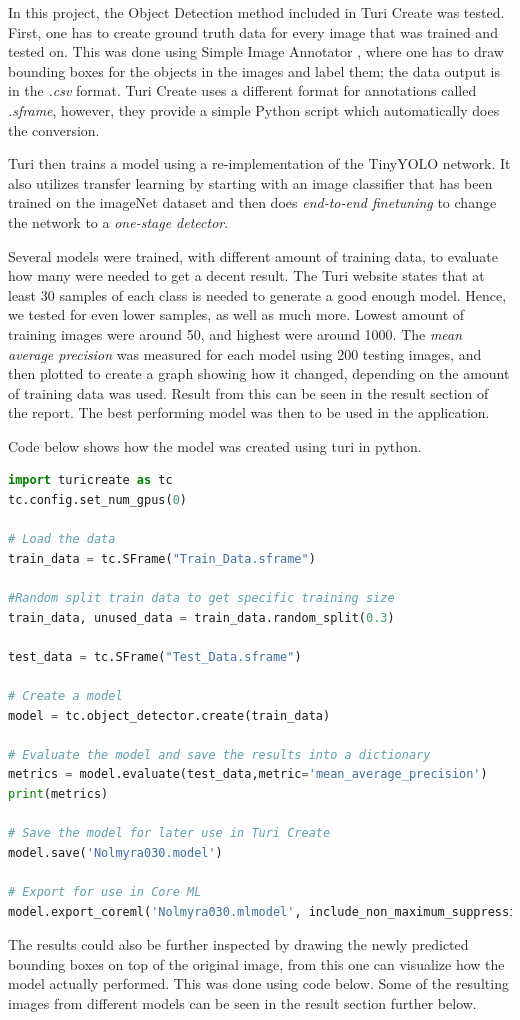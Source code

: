 In this project, the Object Detection method included in Turi Create was tested. First, one
 has to create ground truth data for every image that was trained and tested on. This was
 done using Simple Image Annotator \cite{simpleImage}, where one has to draw bounding
  boxes for the objects in the images and label them; the data output is in the \textit{.csv} format.  Turi Create uses a different format for annotations called \textit{.sframe},
  however, they provide a simple Python script which automatically does the conversion. 

Turi then trains a model using a re-implementation of the TinyYOLO network. It also utilizes transfer learning by starting with an image classifier that has been trained on the imageNet dataset and then does \textit{end-to-end finetuning} to change the network to a \textit{one-stage detector}.

Several models were trained, with different amount of training data, to evaluate how many
 were needed to get a decent result. The Turi website states that at least 30 samples of
each class is needed to generate a good enough model. Hence, we tested for even lower
samples, as well as much more. Lowest amount of training images were around 50, and
highest  were around 1000. The \textit{mean average precision} was measured for each model using 200 testing images, and then plotted to create a graph showing how it
 changed, depending on the amount of training data was used. Result from this can be
 seen in the result section of the report. The best performing model was then to be used in the application.

Code below shows how the model was created using turi in python.
\begin{lstlisting}[language=python]
import turicreate as tc
tc.config.set_num_gpus(0)

# Load the data
train_data = tc.SFrame("Train_Data.sframe")

#Random split train data to get specific training size
train_data, unused_data = train_data.random_split(0.3)

test_data = tc.SFrame("Test_Data.sframe")

# Create a model
model = tc.object_detector.create(train_data)

# Evaluate the model and save the results into a dictionary
metrics = model.evaluate(test_data,metric='mean_average_precision')
print(metrics)

# Save the model for later use in Turi Create
model.save('Nolmyra030.model')

# Export for use in Core ML
model.export_coreml('Nolmyra030.mlmodel', include_non_maximum_suppression=False)
\end{lstlisting}
The results could also be further inspected by drawing the newly predicted bounding boxes on top of the original image, from this one can visualize how the model actually performed. This was done using code below. Some of the resulting images from different models can be seen in the result section further below. 

